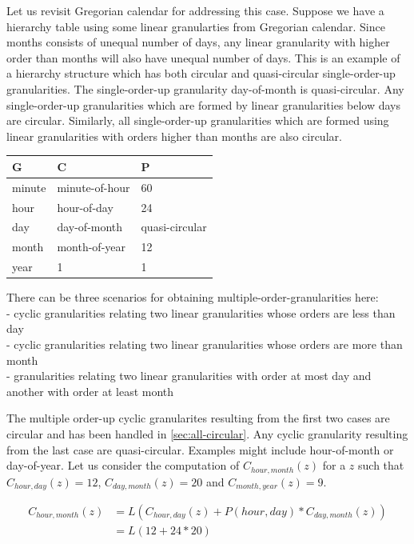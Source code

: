 \documentclass[12pt]{article}
\begin{document}
Let us revisit Gregorian calendar for addressing this case. Suppose we have a hierarchy table using some linear granularties from Gregorian calendar. Since months consists of unequal number of days, any linear granularity with higher order than months will also have unequal number of days. This is an example of a hierarchy structure which has both circular and quasi-circular single-order-up granularities. The single-order-up granularity day-of-month is quasi-circular. Any single-order-up granularities which are formed by linear granularities below days are circular. Similarly, all single-order-up granularities which are formed using linear granularities with orders higher than months are also circular.

\begin{longtable}[]{@{}lll@{}}
\toprule
G & C & P\tabularnewline
\midrule
\endhead
minute & minute-of-hour & 60\tabularnewline
hour & hour-of-day & 24\tabularnewline
day & day-of-month & quasi-circular\tabularnewline
month & month-of-year & 12\tabularnewline
year & 1 & 1\tabularnewline
\bottomrule
\end{longtable}

There can be three scenarios for obtaining multiple-order-granularities here:\\
- cyclic granularities relating two linear granularities whose orders are less than day\\
- cyclic granularities relating two linear granularities whose orders are more than month\\
- granularities relating two linear granularities with order at most day and another with order at least month

The multiple order-up cyclic granularites resulting from the first two cases are circular and has been handled in \autoref{sec:all-circular}. Any cyclic granularity resulting from the last case are quasi-circular. Examples might include hour-of-month or day-of-year. Let us consider the computation of \(C_{hour, month}(z)\) for a \(z\) such that \(C_{hour, day}(z) = 12\), \(C_{day, month}(z) = 20\) and \(C_{month, year}(z) = 9\).

\begin{equation} \label{eq:hour-month}
\begin{split}
C_{hour, month}(z) & = L(C_{hour, day}(z) + P(hour, day)*C_{day, month}(z))\\
& = L(12 + 24*20)\\
\end{split}
\end{equation}
\end{document}
